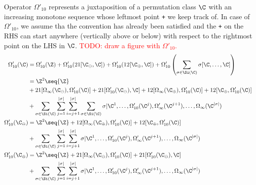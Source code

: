 Operator $\Omega'_{10}$ represents a juxtaposition of a permutation class $\C$ with an increasing monotone sequence whose leftmost point \texttt{+} we keep track of. In case of $\Omega'_{10}$, we assume tha the convention has already been satisfied and the \texttt{+} on the RHS can start anywhere (vertically above or below) with respect to the rightmost point on the LHS in $\C$.
\textcolor{red}{TODO: draw a figure with $\Omega'_{10}$.} 
\begin{align*}
  \Omega'_{10}(\C)   &= \Omega'_{10}(\Z) + \Omega'_{10}(21[\C_\ominus,\C]) + \Omega'_{10}(12[\C_\oplus, \C]) + \Omega'_{10}\left(\sum_{\sigma \in \Si(\C)}\sigma[\C,\ldots,\C]\right)\\
                     &= \Z^2\seq{\Z}\\
                     &+ 21[\Omega_\infty(\C_\ominus), \Omega'_{10}(\C)] + 21[\Omega'_{10}(\C_\ominus),\C] + 12[\Omega_\infty(\C_\oplus), \Omega'_{10}(\C)] + 12[\C_\oplus, \Omega'_{10}(\C)]\\
                     &+ \sum_{\sigma \in \Si(\C)}\sum_{j=1}^{|\sigma|}\sum_{i=j+1}^{|\sigma|}\sum_{\sigma \in \Si(\C)}\sigma\vert{\C^{1},\ldots,\Omega'_{10}(\C^j),\Omega'_\infty(\C^{j+1}),\ldots,\Omega_\infty(\C^{|\sigma|})}\\
  \Omega'_{10}(\C_\ominus) &= \Z^2\seq{\Z} + 12[\Omega_\infty(\C_\oplus), \Omega'_{10}(\C)] + 12[\C_\oplus, \Omega'_{10}(\C)]\\
                     &+ \sum_{\sigma \in \Si(\C)}\sum_{j=1}^{|\sigma|}\sum_{i=j+1}^{|\sigma|}\sigma\vert{\C^{1},\ldots,\Omega'_{10}(\C^j),\Omega'_\infty(\C^{j+1}),\ldots,\Omega_\infty(\C^{|\sigma|})}\\
  \Omega'_{10}(\C_\oplus) &= \Z^2\seq{\Z} + 21[\Omega_\infty(\C_\ominus), \Omega'_{10}(\C)] + 21[\Omega'_{10}(\C_\ominus),\C]\\
                     &+  \sum_{\sigma \in \Si(\C)}\sum_{j=1}^{|\sigma|}\sum_{i=j+1}^{|\sigma|}\sigma\vert{\C^{1},\ldots,\Omega'_{10}(\C^j),\Omega'_\infty(\C^{j+1}),\ldots,\Omega_\infty(\C^{|\sigma|})}\\
\end{align*}

